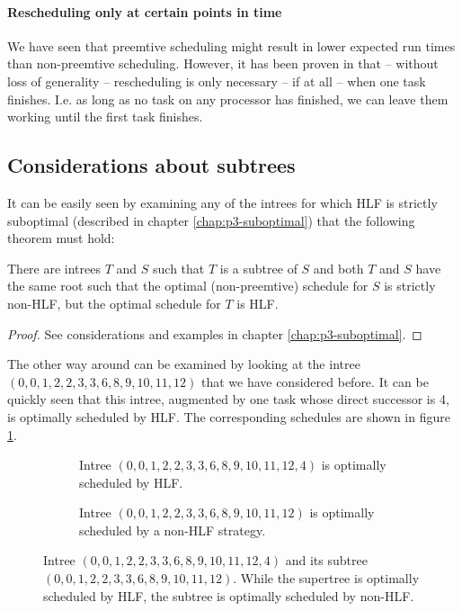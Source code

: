 \paragraph{Rescheduling only at certain points in time}

We have seen that preemtive scheduling might result in lower expected run times than non-preemtive scheduling. However, it has been proven in \cite{chandyreynoldslargepaper1979} that -- without loss of generality -- rescheduling is only necessary -- if at all -- when one task finishes. I.e. as long as no task on any processor has finished, we can leave them working until the first task finishes.

\subsection{Considerations about subtrees}
\label{sec:properties-optimal-schedules-no-implications}

It can be easily seen by examining any of the intrees for which HLF is strictly suboptimal (described in chapter \ref{chap:p3-suboptimal}) that the following theorem must hold:

\begin{theorem}
  There are intrees $T$ and $S$ such that $T$ is a subtree of $S$ and both $T$ and $S$ have the same root such that the optimal (non-preemtive) schedule for $S$ is strictly non-HLF, but the optimal schedule for $T$ is HLF.
\end{theorem}

\begin{proof}
  See considerations and examples in chapter \ref{chap:p3-suboptimal}.
\end{proof}

The other way around can be examined by looking at the intree $(0,0,1,2,2,3,3,6,8,9,10,11,12)$ that we have considered before. It can be quickly seen that this intree, augmented by one task whose direct successor is 4, is optimally scheduled by HLF. The corresponding schedules are shown in figure \ref{fig:supertree-hls-subtree-non-hlf}.

\begin{figure}[th]
  \centering
  \begin{subfigure}{.45\textwidth}
    \centering
    
    \caption{Intree $(0,0,1,2,2,3,3,6,8,9,10,11,12,4)$ is optimally scheduled by HLF.}
  \end{subfigure}
  \quad
  \begin{subfigure}{.45\textwidth}
    \centering
    
    \caption{Intree $(0,0,1,2,2,3,3,6,8,9,10,11,12)$ is optimally scheduled by a non-HLF strategy.}
  \end{subfigure}
  \caption{Intree $(0,0,1,2,2,3,3,6,8,9,10,11,12,4)$ and its subtree $(0,0,1,2,2,3,3,6,8,9,10,11,12)$. While the supertree is optimally scheduled by HLF, the subtree is optimally scheduled by non-HLF.}
  \label{fig:supertree-hls-subtree-non-hlf}
\end{figure}

